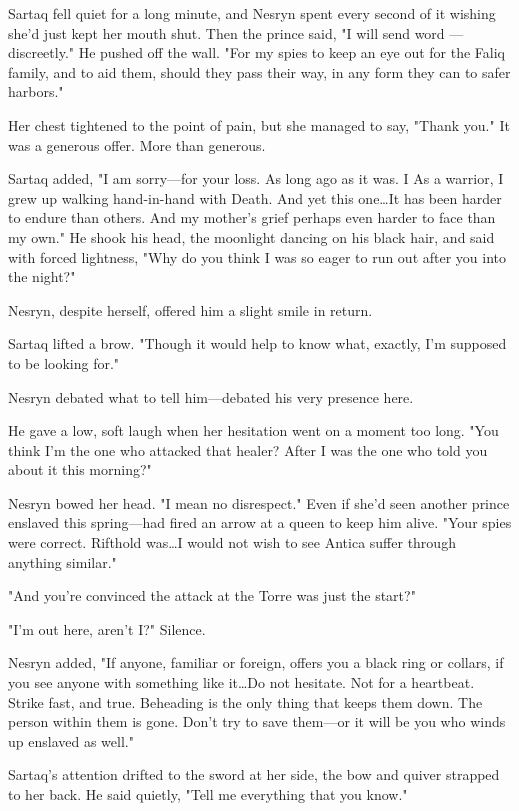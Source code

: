 Sartaq fell quiet for a long minute, and Nesryn spent every second of it wishing she'd just kept her mouth shut.
Then the prince said, "I will send word ---discreetly."
He pushed off the wall.
"For my spies to keep an eye out for the Faliq family, and to aid them, should they pass their way, in any form they can to safer harbors."

Her chest tightened to the point of pain, but she managed to say, "Thank you."
It was a generous offer.
More than generous.

Sartaq added, "I am sorry---for your loss.
As long ago as it was.
I  As a warrior, I grew up walking hand-in-hand with Death.
And yet this one\ldots It has been harder to endure than others.
And my mother's grief perhaps even harder to face than my own."
He shook his head, the moonlight dancing on his black hair, and said with forced lightness, "Why do you think I was so eager to run out after you into the night?"

Nesryn, despite herself, offered him a slight smile in return.

Sartaq lifted a brow.
"Though it would help to know what, exactly, I'm supposed to be looking for."

Nesryn debated what to tell him---debated his very presence here.

He gave a low, soft laugh when her hesitation went on a moment too long.
"You think I'm the one who attacked that healer?
After I was the one who told you about it this morning?"

Nesryn bowed her head.
"I mean no disrespect."
Even if she'd seen another prince enslaved this spring---had fired an arrow at a queen to keep him alive.
"Your spies were correct.
Rifthold was\ldots I would not wish to see Antica suffer through anything similar."

"And you're convinced the attack at the Torre was just the start?"

"I'm out here, aren't I?"
Silence.

Nesryn added, "If anyone, familiar or foreign, offers you a black ring or collars, if you see anyone with something like it\ldots Do not hesitate.
Not for a heartbeat.
Strike fast, and true.
Beheading is the only thing that keeps them down.
The person within them is gone.
Don't try to save them---or it will be you who winds up enslaved as well."

Sartaq's attention drifted to the sword at her side, the bow and quiver strapped to her back.
He said quietly, "Tell me everything that you know."

